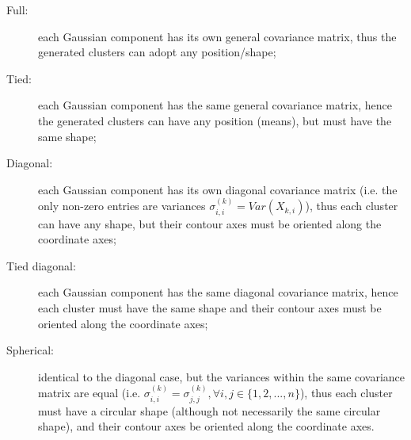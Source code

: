 \begin{description}
    \item[Full:] each Gaussian component has its own general covariance matrix, thus the generated clusters can adopt any position/shape;
    
    \item[Tied:] each Gaussian component has the same general covariance matrix, hence the generated clusters can have any position (means), but must have the same shape;
    
    \item[Diagonal:] each Gaussian component has its own diagonal covariance matrix (i.e. the only non-zero entries are variances $\sigma^{(k)}_{i, i} = Var(X_{k, i})$), thus each cluster can have any shape, but their contour axes must be oriented along the coordinate axes;
    
    \item[Tied diagonal:] each Gaussian component has the same diagonal covariance matrix, hence each cluster must have the same shape and their contour axes must be oriented along the coordinate axes;
    
    \item[Spherical:] identical to the diagonal case, but the variances within the same covariance matrix are equal (i.e. $\sigma^{(k)}_{i, i} = \sigma^{(k)}_{j, j}, \forall i, j \in \{1, 2, ..., n\}$), thus each cluster must have a circular shape (although not necessarily the same circular shape), and their contour axes be oriented along the coordinate axes.
\end{description}